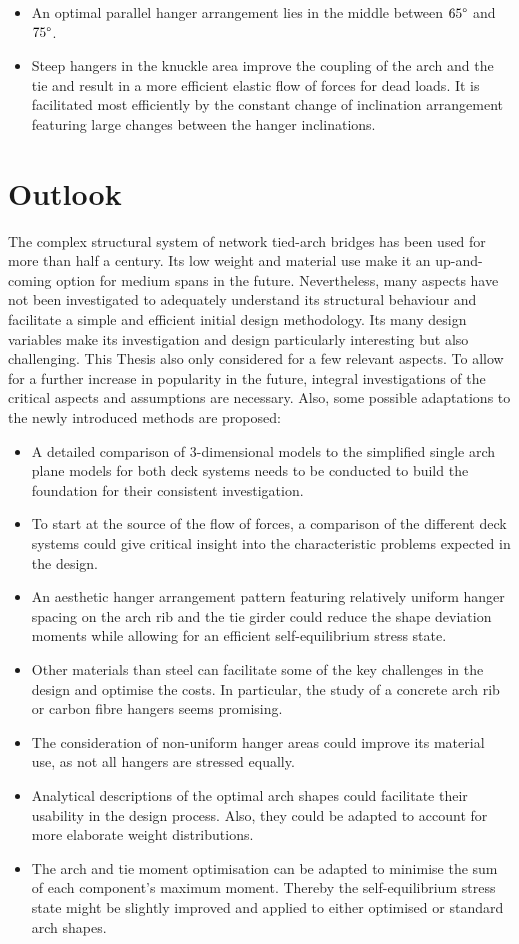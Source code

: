 \begin{itemize}
    \item An optimal parallel hanger arrangement lies in the middle between $65\degree$ and $75\degree$.
    \item Steep hangers in the knuckle area improve the coupling of the arch and the tie and result in a more efficient elastic flow of forces for dead loads. It is facilitated most efficiently by the constant change of inclination arrangement featuring large changes between the hanger inclinations.
\end{itemize}


\cleardoublepage
\chapter{Outlook}\label{sec:outlook}
The complex structural system of network tied-arch bridges has been used for more than half a century. Its low weight and material use make it an up-and-coming option for medium spans in the future. Nevertheless, many aspects have not been investigated to adequately understand its structural behaviour and facilitate a simple and efficient initial design methodology. Its many design variables make its investigation and design particularly interesting but also challenging. This Thesis also only considered for a few relevant aspects. To allow for a further increase in popularity in the future, integral investigations of the critical aspects and assumptions are necessary. Also, some possible adaptations to the newly introduced methods are proposed:
\begin{itemize}
    \item A detailed comparison of 3-dimensional models to the simplified single arch plane models for both deck systems needs to be conducted to build the foundation for their consistent investigation.
    \item To start at the source of the flow of forces, a comparison of the different deck systems could give critical insight into the characteristic problems expected in the design.
    \item An aesthetic hanger arrangement pattern featuring relatively uniform hanger spacing on the arch rib and the tie girder could reduce the shape deviation moments while allowing for an efficient self-equilibrium stress state.
    \item Other materials than steel can facilitate some of the key challenges in the design and optimise the costs. In particular, the study of a concrete arch rib or carbon fibre hangers seems promising.
    \item The consideration of non-uniform hanger areas could improve its material use, as not all hangers are stressed equally.
    \item Analytical descriptions of the optimal arch shapes could facilitate their usability in the design process. Also, they could be adapted to account for more elaborate weight distributions.
    \item The arch and tie moment optimisation can be adapted to minimise the sum of each component's maximum moment. Thereby the self-equilibrium stress state might be slightly improved and applied to either optimised or standard arch shapes.
\end{itemize}

